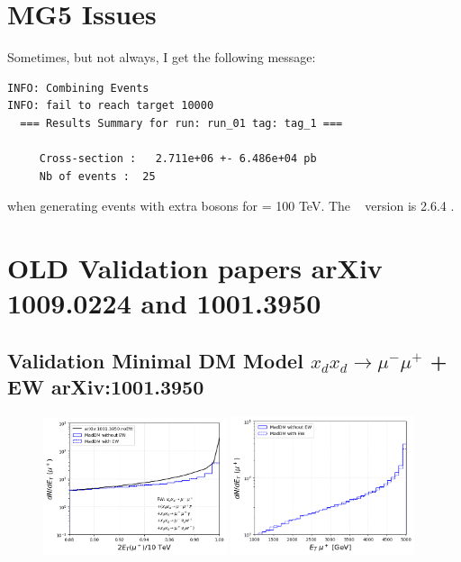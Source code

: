 \documentclass[epj,nopacs,fleqn]{svjour}
\begin{document}
\clearpage
\section{MG5 Issues}
Sometimes, but not always, I get the following message:
\begin{verbatim}
INFO: Combining Events 
INFO: fail to reach target 10000 
  === Results Summary for run: run_01 tag: tag_1 ===

     Cross-section :   2.711e+06 +- 6.486e+04 pb
     Nb of events :  25
\end{verbatim}
when generating events with extra bosons for \mchi = 100 TeV. The \MG~ version is 2.6.4 .
\clearpage


\section{   OLD Validation papers arXiv 1009.0224 and 1001.3950 }
\subsection{Validation Minimal DM Model $x_d x_d \rightarrow \mu^- \mu^+$ + EW arXiv:1001.3950}

\begin{figure}[!h]
	\centering
	\subfigure
	{
		\includegraphics[width=0.48\textwidth]{Fig/Ready/mumu_validation.png} }
	\subfigure
	{
		\includegraphics[width=0.48\textwidth]{Fig/Ready/mumu_validation_basic.png} }
	
	
	\caption{}
	\label{xdxdmumu}
\end{figure}
\end{document}
